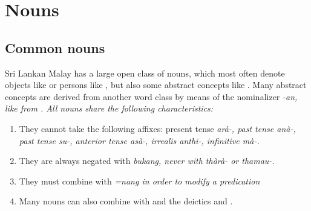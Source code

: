  
 
% 
% 


\section{Nouns}\label{sec:wc:Nouns}
\subsection{Common nouns}\label{sec:wc:Commonnouns}
Sri Lankan Malay has a large open class of nouns, which most often denote objects like  or persons like , but also some abstract concepts like . Many abstract concepts are derived from another word class by means of the nominalizer \em -an\em, like  from .
All nouns share the following characteristics:

\begin{enumerate}
\item They cannot take the following affixes:
	present tense \em arà-\em,
	past tense \em anà-\em,
	past tense \em su-\em,
	anterior tense \em asà-\em,
	irrealis \em anthi-\em,
	infinitive \em mà-\em.
\item  They are always negated with \em bukang\em, never with \em thàrà- \em or \em thamau-\em.
\item  They must combine with \em =nang \em in order to modify a predication
\item Many nouns can also combine with  and the deictics  and .
\end{enumerate}

